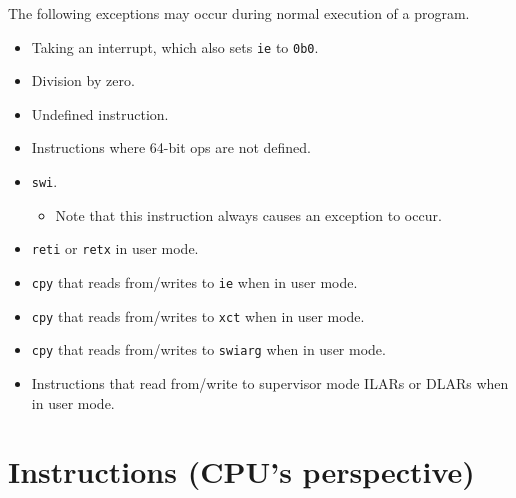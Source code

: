 \documentclass{article}
\begin{document}
	The following exceptions may occur during normal execution of a
	program.

	\begin{itemize}
	\item Taking an interrupt, which also sets \texttt{ie} to \texttt{0b0}.
	\item Division by zero.
	\item Undefined instruction.
	\item Instructions where 64-bit ops are not defined.
	\item \texttt{swi}.
		\begin{itemize}
		\item Note that this instruction always causes an exception to
		occur.
		\end{itemize}
	\item \texttt{reti} or \texttt{retx} in user mode.
	\item \texttt{cpy} that reads from/writes to \texttt{ie} when in user
	mode.
	\item \texttt{cpy} that reads from/writes to \texttt{xct} when in user
	mode.
	\item \texttt{cpy} that reads from/writes to \texttt{swiarg} when in
	user mode.
	\item Instructions that read from/write to supervisor mode
	ILARs or DLARs when in user mode.
	\end{itemize}
	\newpage

\section{Instructions (CPU's perspective)}
\end{document}
